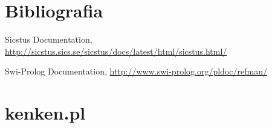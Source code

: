 \documentclass[runningheads,a4paper]{llncs}
\begin{document}
\section{Bibliografia}

\begin{thebibliography}{4}

 Sicstus Documentation, \url{http://sicstus.sics.se/sicstus/docs/latest/html/sicstus.html/}

 Swi-Prolog Documentation, \url{http://www.swi-prolog.org/pldoc/refman/}

\end{thebibliography}

\newpage
\appendix
\section{kenken.pl}
\lstset{
language=Prolog,
numbers=left,
frame=single,
breaklines=true
}


\end{document}
